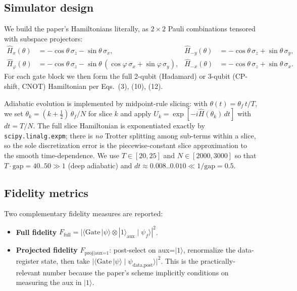 \documentclass[11pt]{article}
\begin{document}
\subsection{Simulator design}

We build the paper's Hamiltonians literally, as $2\times 2$ Pauli combinations tensored with subspace projectors:
\begin{align}
\hat H_x(\theta) &= -\cos\theta\, \sigma_z - \sin\theta\, \sigma_x , & \hat H_{-y}(\theta) &= -\cos\theta\, \sigma_z + \sin\theta\, \sigma_y , \\
\hat H_\varphi(\theta) &= -\cos\theta\, \sigma_z - \sin\theta\, (\cos\varphi\, \sigma_x + \sin\varphi\, \sigma_y) , & \hat H_{-x}(\theta) &= -\cos\theta\, \sigma_z + \sin\theta\, \sigma_x .
\end{align}
For each gate block we then form the full 2-qubit (Hadamard) or 3-qubit (CP-shift, CNOT) Hamiltonian per Eqs.~(3), (10), (12).

Adiabatic evolution is implemented by midpoint-rule slicing: with $\theta(t) = \theta_f \, t/T$, we set $\theta_k = (k+\tfrac12)\,\theta_f/N$ for slice $k$ and apply $U_k = \exp[-i \hat H(\theta_k)\, dt]$ with $dt = T/N$. The full slice Hamiltonian is exponentiated exactly by \texttt{scipy.linalg.expm}; there is \emph{no} Trotter splitting among sub-terms within a slice, so the sole discretization error is the piecewise-constant slice approximation to the smooth time-dependence. We use $T \in [20,25]$ and $N \in [2000,3000]$ so that $T\cdot\text{gap} = 40..50 \gg 1$ (deep adiabatic) and $dt \approx 0.008..0.010 \ll 1/\text{gap} = 0.5$.

\subsection{Fidelity metrics}
Two complementary fidelity measures are reported:
\begin{itemize}
\item \textbf{Full fidelity} $F_\text{full} = |\langle\text{Gate}\,|\psi\rangle \otimes |1\rangle_\text{aux} \mid \psi_f\rangle|^2$.
\item \textbf{Projected fidelity} $F_\text{proj|aux=1}$: post-select on aux=$|1\rangle$, renormalize the data-register state, then take $|\langle\text{Gate}\,|\psi\rangle \mid \psi_\text{data,post}\rangle|^2$. This is the practically-relevant number because the paper's scheme implicitly conditions on measuring the aux in $|1\rangle$.
\end{itemize}
\end{document}
